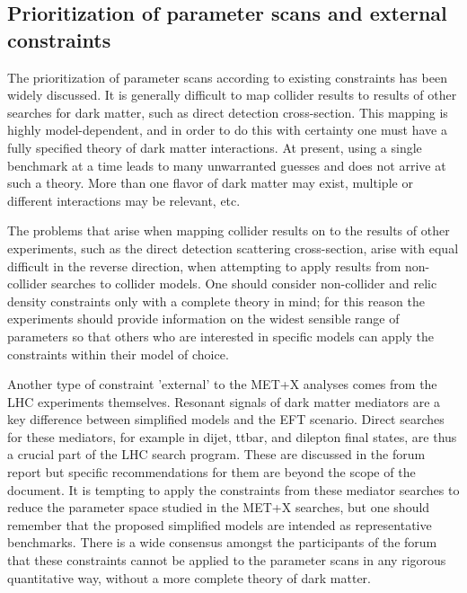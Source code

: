 \documentclass[debug,notitlepage]{dmfm}
\begin{document}

\subsection{Prioritization of parameter scans and external constraints}

The prioritization of parameter scans according to existing constraints 
has been widely discussed. It is generally difficult to map
collider results to results of other searches for dark matter, such as
direct detection cross-section. This mapping is highly
model-dependent, and in order to do this with certainty one must have
a fully specified theory of dark matter interactions. At present,
using a single benchmark at a time leads to many unwarranted guesses
and does not arrive at such a theory.  More than one flavor of dark
matter may exist, multiple or different interactions may be relevant,
etc.

The problems that arise when mapping collider results on to the
results of other experiments, such as the direct detection scattering
cross-section, arise with equal difficult in the reverse direction,
when attempting to apply results from non-collider searches to
collider models. One should consider non-collider and relic density
constraints only with a complete theory in mind; for this reason the
experiments should provide information on the widest sensible range of
parameters so that others who are interested in specific models can
apply the constraints within their model of choice.

Another type of constraint 'external' to the MET+X analyses comes from
the LHC experiments themselves. Resonant signals of dark matter
mediators are a key difference between simplified models and the EFT
scenario. Direct searches for these mediators, for example in dijet,
ttbar, and dilepton final states, are thus a crucial part of the LHC
search program. These are discussed in the forum report but specific
recommendations for them are beyond the scope of the document.  It is
tempting to apply the constraints from these mediator searches to
reduce the parameter space studied in the MET+X searches, but one
should remember that the proposed simplified models are intended as
representative benchmarks. There is a wide consensus amongst the
participants of the forum that these constraints cannot be applied to
the parameter scans in any rigorous quantitative way, without a more
complete theory of dark matter.
\end{document}
